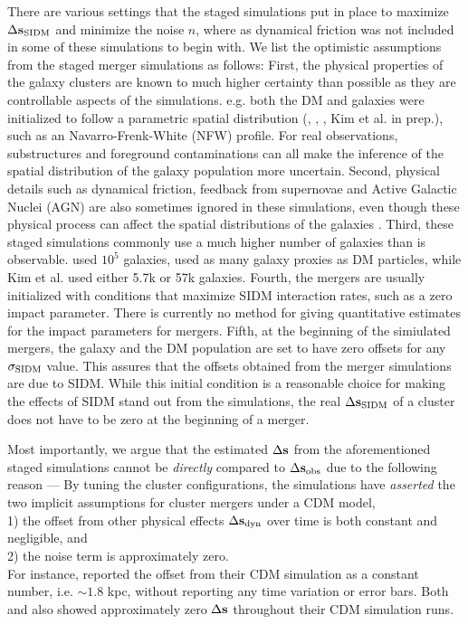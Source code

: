 There are various settings that the staged simulations put in place to maximize
$\Delta {\bf s}_{{\rm SIDM}}$ and minimize the noise $n$, where as  
dynamical friction was not included in some of these
simulations to begin with. 
We list the optimistic assumptions from the staged merger simulations as follows: 
First, the physical properties of the galaxy
clusters are known to much higher certainty than possible as they are
controllable aspects of the simulations. e.g. both the DM and 
galaxies were initialized to follow a parametric spatial 
distribution   
(\citealt{Randall2008d}, \citealt{Kahlhoefer14}, \citealt{Robertson2016}, Kim
et al. in prep.), 
such as an Navarro-Frenk-White (NFW) profile. For real observations,
substructures and foreground
contaminations can all make the inference of the spatial distribution 
of the galaxy population more uncertain. 
Second, physical details such as dynamical friction, feedback from supernovae and Active
Galactic Nuclei (AGN) are also sometimes ignored in these simulations, 
even though these physical process can affect the spatial distributions of the
galaxies \citep{Cui2015}.  
Third, these staged simulations commonly use a much higher number of 
galaxies than is observable. \cite{Randall2008d} used
$10^5$ galaxies, \cite{Kahlhoefer14} used as many galaxy proxies as DM particles, 
while Kim et al. used either 5.7k or 57k galaxies. 
Fourth, the mergers are usually initialized with conditions that maximize SIDM
interaction rates, such as a zero impact parameter. There is currently no
method for giving quantitative estimates for the impact parameters for mergers. 
Fifth, at the beginning of the simiulated mergers, the galaxy and the DM
population are set to have zero offsets for any $\sigma_{\rm SIDM}$ value. 
This assures that the offsets obtained from the merger simulations are due to SIDM. 
While this initial condition 
is a reasonable choice for making the effects of SIDM stand out from the simulations, 
the real $\Delta {\bf s}_{{\rm SIDM}}$ of a cluster does not have to be zero at the beginning of a merger.  

Most importantly, we argue that the estimated $\Delta {\bf s}$ 
from the aforementioned staged simulations cannot be
{\it directly}
compared to $\Delta {\bf s}_{\rm obs}$ due to the following reason --- 
By tuning the cluster configurations, the simulations have {\it asserted}
the two implicit assumptions for cluster mergers under a CDM model, \\
1) the offset from other physical effects $\Delta {\bf s}_{\rm dyn}$ over time 
is both constant and negligible, 
and \\ 
2) the noise term is approximately zero.\\ 
For instance, \cite{Randall2008d} reported the offset from their CDM simulation 
as a constant number, i.e. $\sim 1.8$ kpc, without reporting any time variation or error bars. 
Both \cite{Robertson2016} and
\cite{Kahlhoefer14} also showed approximately zero $\Delta {\bf s}$ throughout their CDM 
simulation runs.   


